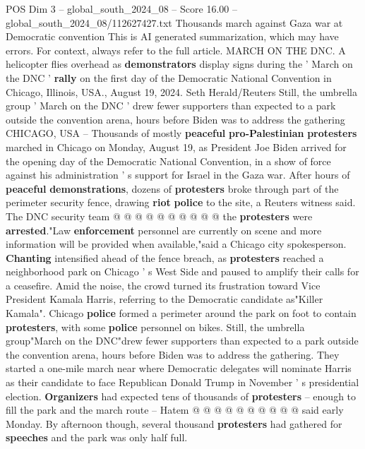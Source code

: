 \begin{textsample}{POS Dim 3 – global\_south\_2024\_08 – Score 16.00 – global\_south\_2024\_08/112627427.txt}  \label{ex:f3_pos_305}
Thousands march against Gaza war at Democratic convention This is AI generated summarization, which may have errors.
For context, always refer to the full article.
MARCH ON THE DNC.
A helicopter flies overhead as \textbf{demonstrators} display signs during the ' March on the DNC ' \textbf{rally} on the first day of the Democratic National Convention in Chicago, Illinois, USA., August 19, 2024.
Seth Herald/Reuters Still, the umbrella group ' March on the DNC ' drew fewer supporters than expected to a park outside the convention arena, hours before Biden was to address the gathering CHICAGO, USA -- Thousands of mostly \textbf{peaceful} \textbf{pro-Palestinian} \textbf{protesters} marched in Chicago on Monday, August 19, as President Joe Biden arrived for the opening day of the Democratic National Convention, in a show of force against his administration ' s support for Israel in the Gaza war.
After hours of \textbf{peaceful} \textbf{demonstrations}, dozens of \textbf{protesters} broke through part of the perimeter security fence, drawing \textbf{riot} \textbf{police} to the site, a Reuters witness said.
The DNC security team @ @ @ @ @ @ @ @ @ @ the \textbf{protesters} were \textbf{arrested}."Law \textbf{enforcement} personnel are currently on scene and more information will be provided when available,"said a Chicago city spokesperson. \textbf{Chanting} intensified ahead of the fence breach, as \textbf{protesters} reached a neighborhood park on Chicago ' s West Side and paused to amplify their calls for a ceasefire.
Amid the noise, the crowd turned its frustration toward Vice President Kamala Harris, referring to the Democratic candidate as"Killer Kamala".
Chicago \textbf{police} formed a perimeter around the park on foot to contain \textbf{protesters}, with some \textbf{police} personnel on bikes.
Still, the umbrella group"March on the DNC"drew fewer supporters than expected to a park outside the convention arena, hours before Biden was to address the gathering.
They started a one-mile march near where Democratic delegates will nominate Harris as their candidate to face Republican Donald Trump in November ' s presidential election. \textbf{Organizers} had expected tens of thousands of \textbf{protesters} -- enough to fill the park and the march route -- Hatem @ @ @ @ @ @ @ @ @ @ said early Monday.
By afternoon though, several thousand \textbf{protesters} had gathered for \textbf{speeches} and the park was only half full.

\end{textsample}
